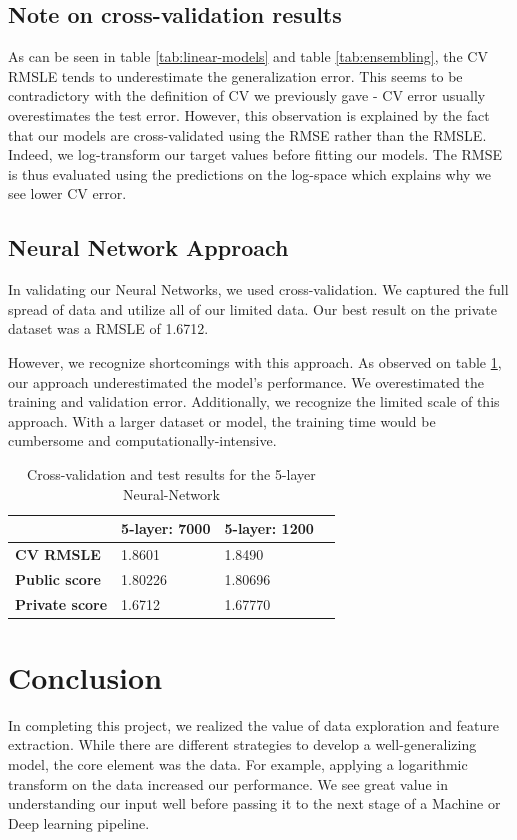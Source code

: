 \documentclass[sigplan,screen]{acmart}
\begin{document}
\subsection{Note on cross-validation results}
As can be seen in table \ref{tab:linear-models} and table \ref{tab:ensembling}, the CV RMSLE tends to underestimate the generalization error. This seems to be contradictory with the definition of CV we previously gave - CV error usually overestimates the test error. However, this observation is explained by the fact that our models are cross-validated using the RMSE rather than the RMSLE. Indeed, we log-transform our target values before fitting our models. The RMSE is thus evaluated using the predictions on the log-space which explains why we see lower CV error.

\subsection{Neural Network Approach}
In validating our Neural Networks, we used cross-validation.  We captured the full spread of data and utilize all of our limited data. Our best result on the private dataset was a RMSLE of 1.6712.

However, we recognize shortcomings with this approach. As observed on table \ref{tab:nn}, our approach underestimated the model's performance. We overestimated the training and validation error. Additionally, we recognize the limited scale of this approach. With a larger dataset or model, the  training time would be cumbersome and computationally-intensive.

\begin{table}[H]
\begin{tabular}{|l|l|l|l|}
\hline
                       & \textbf{5-layer: 7000} &  \textbf{5-layer: 1200}\\ \hline
\textbf{CV RMSLE}      & 1.8601     &         1.8490             \\ \hline
\textbf{Public score}  & 1.80226    &         1.80696           \\ \hline
\textbf{Private score} & 1.6712      &        1.67770              \\ \hline
\end{tabular}
\caption{Cross-validation and test results for the 5-layer Neural-Network}
\label{tab:nn}
\end{table}

\vspace*{-\baselineskip}

\section{Conclusion}
In completing this project, we realized the value of data exploration and feature extraction. While there are different strategies to develop a well-generalizing model, the core element was the data.  For example, applying a logarithmic transform on the data increased our performance. We see great value in understanding our input well before passing it to the next stage of a Machine or Deep learning pipeline.
\end{document}
